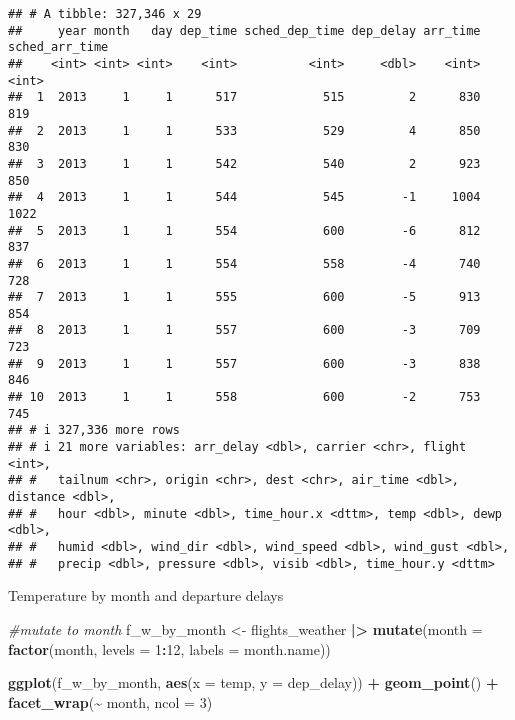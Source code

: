 \documentclass[
]{article}
\newenvironment{Shaded}{\begin{snugshade}}{\end{snugshade}}
\newcommand{\AttributeTok}[1]{\textcolor[rgb]{0.13,0.29,0.53}{#1}}
\newcommand{\CommentTok}[1]{\textcolor[rgb]{0.56,0.35,0.01}{\textit{#1}}}
\newcommand{\DecValTok}[1]{\textcolor[rgb]{0.00,0.00,0.81}{#1}}
\newcommand{\FunctionTok}[1]{\textcolor[rgb]{0.13,0.29,0.53}{\textbf{#1}}}
\newcommand{\NormalTok}[1]{#1}
\newcommand{\OtherTok}[1]{\textcolor[rgb]{0.56,0.35,0.01}{#1}}
\newcommand{\SpecialCharTok}[1]{\textcolor[rgb]{0.81,0.36,0.00}{\textbf{#1}}}
\begin{document}
\begin{verbatim}
## # A tibble: 327,346 x 29
##     year month   day dep_time sched_dep_time dep_delay arr_time sched_arr_time
##    <int> <int> <int>    <int>          <int>     <dbl>    <int>          <int>
##  1  2013     1     1      517            515         2      830            819
##  2  2013     1     1      533            529         4      850            830
##  3  2013     1     1      542            540         2      923            850
##  4  2013     1     1      544            545        -1     1004           1022
##  5  2013     1     1      554            600        -6      812            837
##  6  2013     1     1      554            558        -4      740            728
##  7  2013     1     1      555            600        -5      913            854
##  8  2013     1     1      557            600        -3      709            723
##  9  2013     1     1      557            600        -3      838            846
## 10  2013     1     1      558            600        -2      753            745
## # i 327,336 more rows
## # i 21 more variables: arr_delay <dbl>, carrier <chr>, flight <int>,
## #   tailnum <chr>, origin <chr>, dest <chr>, air_time <dbl>, distance <dbl>,
## #   hour <dbl>, minute <dbl>, time_hour.x <dttm>, temp <dbl>, dewp <dbl>,
## #   humid <dbl>, wind_dir <dbl>, wind_speed <dbl>, wind_gust <dbl>,
## #   precip <dbl>, pressure <dbl>, visib <dbl>, time_hour.y <dttm>
\end{verbatim}

Temperature by month and departure delays

\begin{Shaded}
\begin{Highlighting}[]
\CommentTok{\#mutate to month }
\NormalTok{f\_w\_by\_month }\OtherTok{\textless{}{-}}\NormalTok{ flights\_weather }\SpecialCharTok{|\textgreater{}}
  \FunctionTok{mutate}\NormalTok{(}\AttributeTok{month =} \FunctionTok{factor}\NormalTok{(month, }\AttributeTok{levels =} \DecValTok{1}\SpecialCharTok{:}\DecValTok{12}\NormalTok{, }\AttributeTok{labels =}\NormalTok{ month.name))}

\FunctionTok{ggplot}\NormalTok{(f\_w\_by\_month, }\FunctionTok{aes}\NormalTok{(}\AttributeTok{x =}\NormalTok{ temp, }\AttributeTok{y =}\NormalTok{ dep\_delay)) }\SpecialCharTok{+} 
  \FunctionTok{geom\_point}\NormalTok{() }\SpecialCharTok{+}
  \FunctionTok{facet\_wrap}\NormalTok{(}\SpecialCharTok{\textasciitilde{}}\NormalTok{ month, }\AttributeTok{ncol =} \DecValTok{3}\NormalTok{)}
\end{Highlighting}
\end{Shaded}
\end{document}
